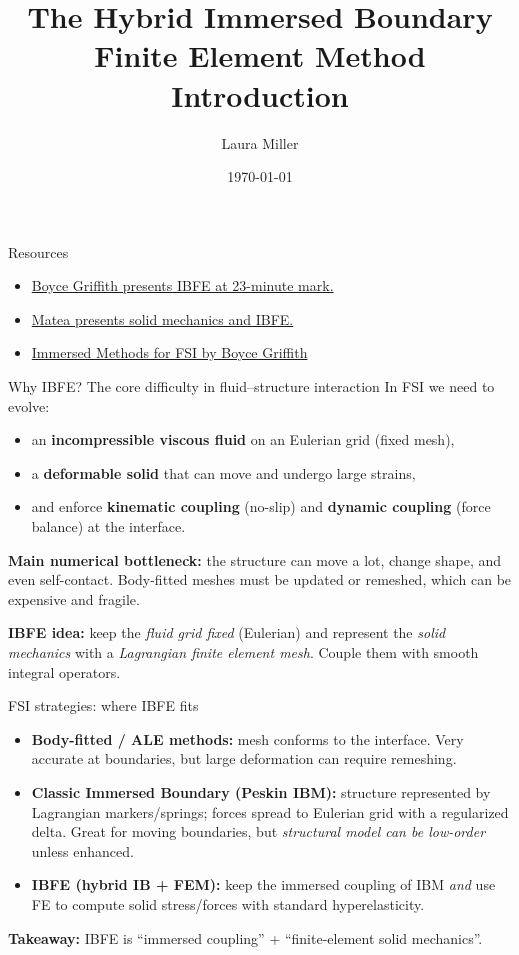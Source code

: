\documentclass{beamer}
\title{The Hybrid Immersed Boundary Finite Element Method Introduction}
\author{Laura Miller}
\date{\today}
\begin{document}
\frame{\titlepage}

\begin{frame}{Resources}
  \begin{itemize}
    \item \href{https://www.youtube.com/watch?v=-1TlNJL93sc}{Boyce Griffith presents IBFE at 23-minute mark.}
    \item \href{https://drive.google.com/drive/folders/1vkhrX0YInMm5pfUj3LcRA9TV0DZdFp1a?usp=sharing}{Matea presents solid mechanics and IBFE.}
    \item \href{https://www.classcentral.com/classroom/youtube-aim-micde-seminar-boyce-griffith-immersed-methods-for-fluid-structure-interaction-323154}{Immersed Methods for FSI by Boyce Griffith}
  \end{itemize}
\end{frame}

\begin{frame}{Why IBFE? The core difficulty in fluid--structure interaction}
\small
In FSI we need to evolve:
\begin{itemize}
  \item an \textbf{incompressible viscous fluid} on an Eulerian grid (fixed mesh),
  \item a \textbf{deformable solid} that can move and undergo large strains,
  \item and enforce \textbf{kinematic coupling} (no-slip) and \textbf{dynamic coupling} (force balance) at the interface.
\end{itemize}

\medskip
\textbf{Main numerical bottleneck:} the structure can move a lot, change shape, and even self-contact.
Body-fitted meshes must be updated or remeshed, which can be expensive and fragile.

\medskip
\textbf{IBFE idea:} keep the \emph{fluid grid fixed} (Eulerian) and represent the \emph{solid mechanics} with a \emph{Lagrangian finite element mesh}.
Couple them with smooth integral operators.
\end{frame}


\begin{frame}{FSI strategies: where IBFE fits}
\small
\begin{itemize}
  \item \textbf{Body-fitted / ALE methods:}
  mesh conforms to the interface. Very accurate at boundaries, but large deformation can require remeshing.
  \item \textbf{Classic Immersed Boundary (Peskin IBM):}
  structure represented by Lagrangian markers/springs; forces spread to Eulerian grid with a regularized delta.
  Great for moving boundaries, but \emph{structural model can be low-order} unless enhanced.
  \item \textbf{IBFE (hybrid IB + FEM):}
  keep the immersed coupling of IBM \emph{and} use FE to compute solid stress/forces with standard hyperelasticity.
\end{itemize}

\medskip
\textbf{Takeaway:} IBFE is ``immersed coupling'' + ``finite-element solid mechanics''.
\end{frame}
\end{document}
